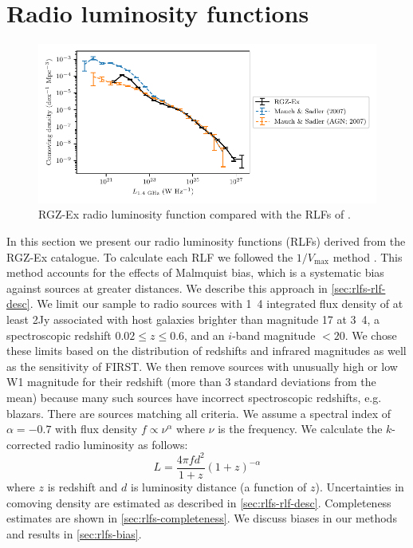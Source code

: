 \section{Radio luminosity functions}
\label{sec:rlfs-rlf}

  \begin{figure}
      \centering
    \includegraphics{rlf-images/rlf.pdf}
    \caption{RGZ-Ex radio luminosity function compared with the RLFs of \citet{mauch07rlf}.
      \label{fig:rlf}}
  \end{figure}

  In this section we present our radio luminosity functions (RLFs) derived
  from the RGZ-Ex catalogue. To calculate each RLF we 
  followed the $1/V_{\max}$ method \citep{schmidt1968vmax}. This method accounts for the effects of Malmquist bias, which is a systematic bias against sources at greater distances. We
  describe this approach in \autoref{sec:rlfs-rlf-desc}. We limit our sample to radio sources with
  \unit{1.4}{\giga\hertz} integrated flux density of at least \unit{2}{\milli Jy}
  associated with host galaxies brighter than magnitude 17 at
  \unit{3.4}{\micro\meter}, a spectroscopic redshift $0.02 \leq z \leq 0.6$,
  and an $i$-band magnitude $<20$. We chose these
  limits based on the distribution of redshifts and infrared magnitudes as well as the sensitivity of FIRST. We then remove sources with unusually high or low W1 magnitude for their redshift (more than 3 standard deviations from the mean) because many such sources have incorrect spectroscopic redshifts, e.g. blazars. There are \nsourcesrlf{} sources matching all criteria. We assume a spectral index of $\alpha = -0.7$ \citep[as is common in literature, e.g.][]{condon02radio} with flux density $f \propto \nu^{\alpha}$ where $\nu$ is the frequency. We calculate the $k$-corrected radio luminosity \citep{kochanek01kband} as follows:
  \begin{equation}
      \label{eq:luminosity}
      L = \frac{4\pi f d^2}{1+z}{(1+z)^{-\alpha}}
  \end{equation}
  where $z$ is redshift and $d$ is luminosity distance (a function of $z$).
  Uncertainties in comoving density are estimated as described in \autoref{sec:rlfs-rlf-desc}. Completeness estimates are shown in \autoref{sec:rlfs-completeness}. We discuss biases in our methods and results in \autoref{sec:rlfs-bias}.

